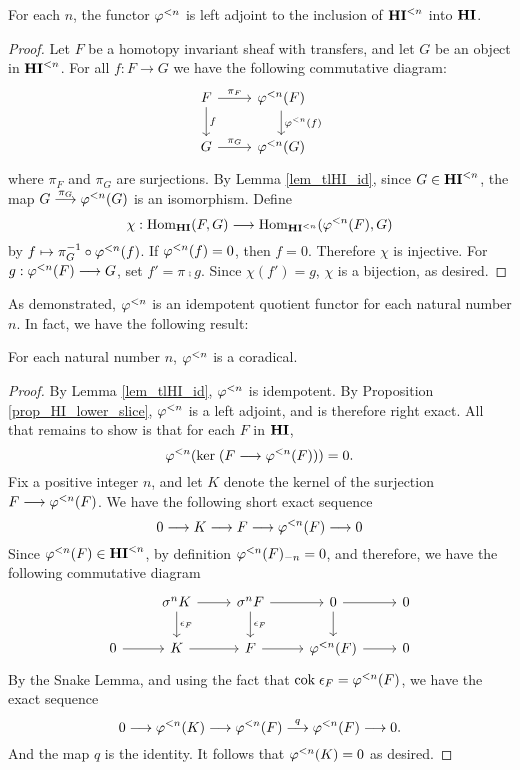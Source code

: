 \begin{prop}\label{prop_HI_lower_slice}
For each $n$, the functor $\tlHI{n}$ is left adjoint to the 
inclusion of $\TLHI{n}{\HI}$ into $\HI$.
\end{prop}
\begin{proof}
Let $F$ be a homotopy invariant sheaf with transfers, and let $G$ 
be an object in $\TLHI{n}{\HI}$. For all $f: F \to G$ we have the 
following commutative diagram:
\[
\begin{tikzcd}
F \arrow{r}{\pi_F} \arrow{d}{f}
& \tlHI{n}(F) \arrow{d}{\tlHI{n}(f)} \\
G \arrow{r}{\pi_G}
& \tlHI{n}(G) 
\end{tikzcd}
\]
where $\pi_F$ and $\pi_G$ are surjections. By Lemma 
\ref{lem_tlHI_id}, since $G \in \TLHI{n}{\HI}$, the map $G 
\stackrel{\pi_G}{\to} \tlHI{n}(G)$ is an isomorphism. Define
\[
\chi : \homHI(F, G) \to \hom_{\TLHI{n}{\HI}}(\tlHI{n}(F), G)
\]
by $f \mapsto \pi_G^{-1} \circ \tlHI{n}(f)$. If $\tlHI{n}(f) = 0$, 
then $f = 0$. Therefore $\chi$ is injective. For $g: \tlHI{n}(F) 
\to G$, set $f' = \pi \comp g$. Since $\chi(f') = g$, $\chi$ is a 
bijection, as desired.
\end{proof}

As demonstrated, $\tlHI{n}$ is an idempotent quotient functor
for each natural number $n$. In fact, we have the following 
result:

\begin{prop}\label{prop_tlHIn_corad}
For each natural number $n$, $\tlHI{n}$ is a coradical.
\end{prop}
\begin{proof}
By Lemma \ref{lem_tlHI_id}, $\tlHI{n}$ is idempotent. By Proposition
\ref{prop_HI_lower_slice}, $\tlHI{n}$ is a left adjoint, and
is therefore right exact. All that remains to show is that for
each $F$ in $\HI$,
\[
\tlHI{n}(\ker (F \to \tlHI{n}(F))) = 0.
\]
Fix a positive integer $n$, and let $K$ denote the kernel of the 
surjection $F \to \tlHI{n}(F)$. We have the following short exact 
sequence 
\[
0 \to K \to F \to \tlHI{n}(F) \to 0
\]
Since $\tlHI{n}(F) \in \TLHI{n}{\HI}$, by definition 
$\RHI[n]{\tlHI{n}(F)} = 0$, and therefore, we have the following
commutative diagram
\[
\begin{tikzcd}
{} &\sgHI{n} K \arrow{d}{\cuHI_F} \arrow{r}
   &\sgHI{n} F \arrow{d}{\cuHI_F} \arrow{r}
   &0 \arrow{d} \arrow{r}
   &0 \\
0 \arrow{r} &
  K \arrow{r}&
  F \arrow{r}&
  \tlHI{n}(F) \arrow{r}&
  0
\end{tikzcd}
\]
By the Snake Lemma, and using the fact that $\cok \cuHI_F = 
\tlHI{n}(F)$, we have the exact sequence
\[
0 \to \tlHI{n}(K) \to \tlHI{n}(F) \stackrel{q}{\to} \tlHI{n}(F) 
   \to 0.
\]
And the map $q$ is the identity. It follows that $\tlHI{n}(K) = 0$ 
as desired.
\end{proof}

